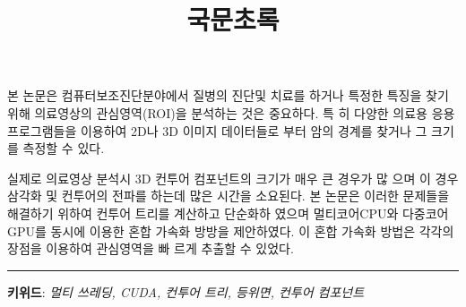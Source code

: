 \documentclass[11pt, b5paper]{article}
\title{\huge{국문초록}}
\date{}
\begin{document}
\maketitle{}
\setcounter{page}{38}
  본 논문은 컴퓨터보조진단분야에서 질병의 진단및 치료를 하거나 특정한
특징을 찾기 위해 의료영상의 관심영역(ROI)을 분석하는 것은 중요하다. 특
히 다양한 의료용 응용프로그램들을 이용하여 2D나 3D 이미지 데이터들로
부터 암의 경계를 찾거나 그 크기를 측정할 수 있다.

  실제로 의료영상 분석시 3D 컨투어 컴포넌트의 크기가 매우 큰 경우가 많
으며 이 경우 삼각화 및 컨투어의 전파를 하는데 많은 시간을 소요된다. 본
논문은 이러한 문제들을 해결하기 위하여 컨투어 트리를 계산하고 단순화하
였으며 멀티코어CPU와 다중코어GPU를 동시에 이용한 혼합 가속화 방방을
제안하였다. 이 혼합 가속화 방법은 각각의 장점을 이용하여 관심영역을 빠
르게 추출할 수 있었다.
\vfill{}
\noindent\rule{\linewidth}{0.2mm}

\noindent\small{\textbf{키위드}: \textit{멀티 쓰레딩, CUDA, 컨투어 트리, 등위면, 컨투어 컴포넌트}}
\end{document}
